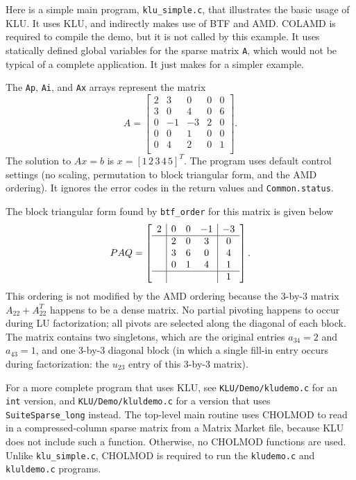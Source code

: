 \documentclass[11pt]{article}
\begin{document}
Here is a simple main program, {\tt klu\_simple.c}, that illustrates the basic
usage of KLU.  It uses KLU, and indirectly makes use of BTF and AMD.  COLAMD is
required to compile the demo, but it is not called by this example.  It uses
statically defined global variables for the sparse matrix {\tt A}, which would
not be typical of a complete application.  It just makes for a simpler example.

{\footnotesize

}

The {\tt Ap}, {\tt Ai}, and {\tt Ax} arrays represent the matrix
\[
A = \left[
\begin{array}{ccccc}
 2 &  3 &  0 &  0 &  0 \\
 3 &  0 &  4 &  0 &  6 \\
 0 & -1 & -3 &  2 &  0 \\
 0 &  0 &  1 &  0 &  0 \\
 0 &  4 &  2 &  0 &  1 \\
\end{array}
\right].
\]
The solution to $Ax=b$ is $x = [1 \, 2 \, 3 \, 4 \, 5]^T$.  The program
uses default control settings (no scaling, permutation to block triangular
form, and the AMD ordering).  It ignores the error codes in the return values
and {\tt Common.status}.

The block triangular form found by {\tt btf\_order} for this matrix is
given below
\[
PAQ = \left[
\begin{array}{c|ccc|c}
2 & 0 & 0 & -1 & -3 \\
\hline
  & 2 & 0 & 3 & 0 \\
  & 3 & 6 & 0 & 4 \\
  & 0 & 1 & 4 & 1 \\
\hline
  &   &   &   & 1 \\
\end{array}
\right].
\]
This ordering is not modified by the AMD ordering because the 3-by-3 matrix
$A_{22} + A_{22}^T$ happens to be a dense matrix.  No partial pivoting happens
to occur during LU factorization; all pivots are selected along the diagonal of
each block.  The matrix contains two singletons, which are the original entries
$a_{34}=2$ and $a_{43}=1$, and one 3-by-3 diagonal block (in which a single
fill-in entry occurs during factorization: the $u_{23}$ entry of this 3-by-3
matrix).

For a more complete program that uses KLU, see {\tt KLU/Demo/kludemo.c} for an
{\tt int} version, and {\tt KLU/Demo/kluldemo.c} for a version that uses {\tt
SuiteSparse\_long} instead.  The top-level main routine uses CHOLMOD to read in a
compressed-column sparse matrix from a Matrix Market file, because KLU does not
include such a function.  Otherwise, no CHOLMOD functions are used.  Unlike
{\tt klu\_simple.c}, CHOLMOD is required to run the {\tt kludemo.c} and {\tt
kluldemo.c} programs.
\end{document}
